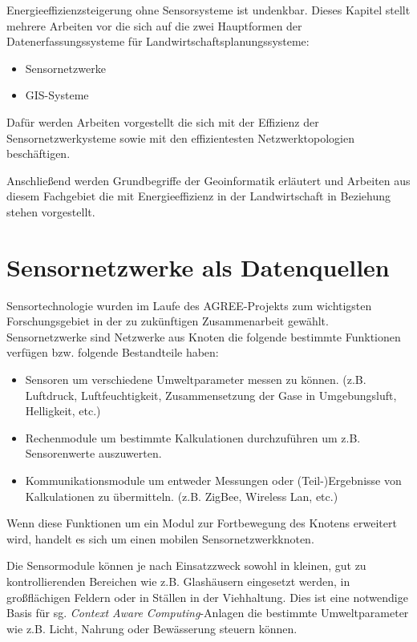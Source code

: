 Energieeffizienzsteigerung ohne Sensorsysteme ist undenkbar. Dieses Kapitel stellt mehrere Arbeiten vor die sich auf die zwei Hauptformen der Datenerfassungssysteme für Landwirtschaftsplanungssysteme:

\begin{itemize}
	\item Sensornetzwerke
	\item GIS-Systeme
\end{itemize}

Dafür werden Arbeiten vorgestellt die sich mit der Effizienz der Sensornetzwerkysteme sowie mit den effizientesten Netzwerktopologien beschäftigen.

Anschließend werden Grundbegriffe der Geoinformatik erläutert und Arbeiten aus diesem Fachgebiet die mit Energieeffizienz in der Landwirtschaft in Beziehung stehen vorgestellt. 

\section{Sensornetzwerke als Datenquellen}
Sensortechnologie wurden im Laufe des AGREE-Projekts zum wichtigsten Forschungsgebiet in der zu zukünftigen Zusammenarbeit gewählt.\cite{misc:Mikkola2013} Sensornetzwerke sind Netzwerke aus Knoten die folgende bestimmte Funktionen verfügen bzw. folgende Bestandteile haben:
\begin{itemize}
	\item Sensoren um verschiedene Umweltparameter messen zu können. (z.B. Luftdruck, Luftfeuchtigkeit, Zusammensetzung der Gase in Umgebungsluft, Helligkeit, etc.)
	\item Rechenmodule um bestimmte Kalkulationen durchzuführen um z.B. Sensorenwerte auszuwerten.
	\item Kommunikationsmodule um entweder Messungen oder (Teil-)Ergebnisse von Kalkulationen zu übermitteln. (z.B. ZigBee, Wireless Lan, etc.)
\end{itemize}
Wenn diese Funktionen um ein Modul zur Fortbewegung des Knotens erweitert wird, handelt es sich um einen mobilen Sensornetzwerkknoten.\cite{jour:Howard2002}

Die Sensormodule können je nach Einsatzzweck sowohl in kleinen, gut zu kontrollierenden Bereichen wie z.B. Glashäusern eingesetzt werden, in großflächigen Feldern oder in Ställen in der Viehhaltung. Dies ist eine notwendige Basis für sg. \textit{Context Aware Computing}-Anlagen die bestimmte Umweltparameter wie z.B. Licht, Nahrung oder Bewässerung steuern können. 

